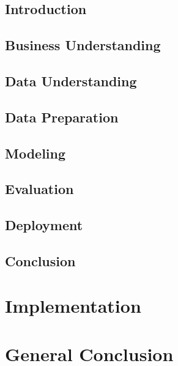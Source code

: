 \documentclass[12pt]{report}
\begin{document}
\section*{Introduction}

\pagebreak  %



\section{Business Understanding} %

\section{Data Understanding} %

\section{Data Preparation} %

\section{Modeling} %

\section{Evaluation} %

\section{Deployment} %


\section*{Conclusion}





\setcounter{chapter}{5} 
\chapter{Implementation} %
\label{chap:implementation}


\pagebreak  %






\newpage

\chapter*{General Conclusion}




\end{document}
